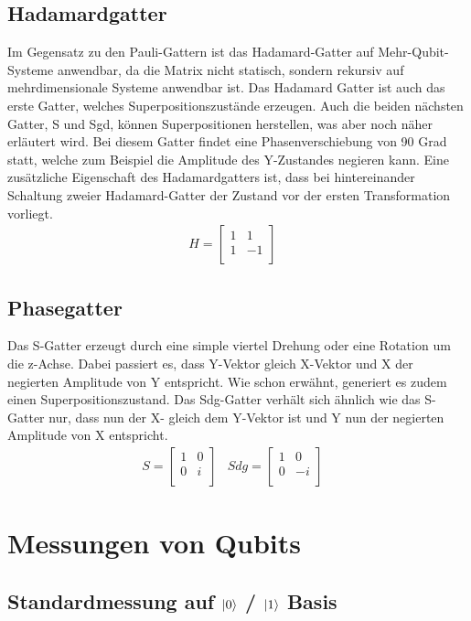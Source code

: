 \documentclass[12pt]{report}
\begin{document}
	\subsection{Hadamardgatter}
	Im Gegensatz zu den Pauli-Gattern ist das Hadamard-Gatter auf Mehr-Qubit-Systeme anwendbar, da die Matrix nicht statisch, sondern rekursiv auf mehrdimensionale Systeme anwendbar ist. Das Hadamard Gatter ist auch das erste Gatter, welches Superpositionszustände erzeugen. Auch die beiden nächsten Gatter, S und Sgd, können Superpositionen herstellen, was aber noch näher erläutert wird.  Bei diesem Gatter findet eine Phasenverschiebung von 90 Grad statt, welche zum Beispiel die Amplitude des Y-Zustandes negieren kann. Eine zusätzliche Eigenschaft des Hadamardgatters ist, dass bei hintereinander Schaltung zweier Hadamard-Gatter der Zustand vor der ersten Transformation vorliegt.  
\begin{align*}
H= \begin{bmatrix} 
1&1\\
1&-1\\
\end{bmatrix} &
\end{align*}
	\subsection{Phasegatter}
	Das S-Gatter erzeugt durch eine simple viertel Drehung oder eine Rotation um die z-Achse. Dabei passiert es, dass Y-Vektor gleich X-Vektor und X der negierten Amplitude von Y entspricht. Wie schon erwähnt, generiert es zudem einen Superpositionszustand. \newline
Das Sdg-Gatter verhält sich ähnlich wie das S- Gatter nur, dass nun der X- gleich dem Y-Vektor ist und Y nun der negierten Amplitude von X entspricht.
\begin{align*}
S= \begin{bmatrix} 
1&0\\
0&i\\
\end{bmatrix} & Sdg= \begin{bmatrix} 
1&0\\
0&-i\\
\end{bmatrix} &
\end{align*}

\section{Messungen von Qubits}
\subsection{Standardmessung auf $\ket{0}$ / $\ket{1}$ Basis}	%
\end{document}
